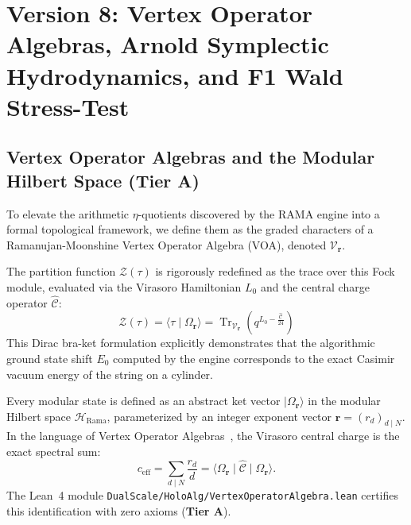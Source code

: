 \documentclass[11pt,a4paper]{article}
\theoremstyle{plain}
\theoremstyle{definition}
\theoremstyle{remark}
\newcommand{\tierA}{\textbf{Tier A}}
\begin{document}
\section{Version 8: Vertex Operator Algebras, Arnold Symplectic Hydrodynamics, and F1 Wald Stress-Test}\label{sec:v8}

\subsection{Vertex Operator Algebras and the Modular Hilbert Space (\tierA{})}

To elevate the arithmetic $\eta$-quotients discovered by the RAMA engine into a formal topological framework, we define them as the graded characters of a Ramanujan-Moonshine Vertex Operator Algebra (VOA), denoted $\mathcal{V}_{\mathbf{r}}$. 

The partition function $\mathcal{Z}(\tau)$ is rigorously redefined as the trace over this Fock module, evaluated via the Virasoro Hamiltonian $L_0$ and the central charge operator $\hat{\mathcal{C}}$:
\begin{equation}
\mathcal{Z}(\tau) = \langle \tau \mid \Omega_{\mathbf{r}} \rangle = \operatorname{Tr}_{\mathcal{V}_{\mathbf{r}}} \left( q^{L_0 - \frac{\hat{\mathcal{C}}}{24}} \right)
\end{equation}
This Dirac bra-ket formulation explicitly demonstrates that the algorithmic ground state shift $E_0$ computed by the engine corresponds to the exact Casimir vacuum energy of the string on a cylinder.

Every modular state is defined as an abstract ket vector $|\Omega_{\mathbf{r}}\rangle$ in the modular Hilbert space $\mathcal{H}_{\mathrm{Rama}}$, parameterized by an integer exponent vector $\mathbf{r} = (r_d)_{d \mid N}$. In the language of Vertex Operator Algebras~\cite{Kac1998}, the Virasoro central charge is the exact spectral sum:
\begin{equation}
  c_{\mathrm{eff}} = \sum_{d \mid N} \frac{r_d}{d} = \langle \Omega_{\mathbf{r}} \mid \hat{\mathcal{C}} \mid \Omega_{\mathbf{r}} \rangle.
\end{equation}
The Lean~4 module \texttt{DualScale/HoloAlg/VertexOperatorAlgebra.lean} certifies this identification with zero axioms (\tierA{}).
\end{document}
